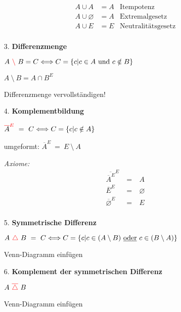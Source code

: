 \begin{itemize}[leftmargin=*]
\begin{align*}
                        A \cup A &= A & \text{Itempotenz} \\
                        A \cup \varnothing &= A & \text{Extremalgesetz} \\
                        A \cup E &= E & \text{Neutralitätsgesetz} \\
                        \end{align*}
                    \item[3.] \textbf{Differenzmenge}
                    \item[] $A \ \textcolor{red}{\setminus} \ B = C \Longleftrightarrow C = \{c|c \in A ~\text{und}~ c \notin B \}$
                    \item[] $A \ \setminus \ B = A \cap B^E$
                    \item[] Differenzmenge vervollständigen!   
                    \item[4.] \textbf{Komplementbildung}
                    \item[] $\textcolor{red}{\overline{\textcolor{black}{A}}^E} \ = \ C \Longleftrightarrow C = \{c|c \notin A \}$
                    \item[] umgeformt: $\overline{A}^E \ = \ E \ \setminus \ A$
                    \item[] \textit{Axiome:} \begin{eqnarray*}
                            \overline{\overline{A}^E}^E \ &=& \ A \\
                            \overline{E}^E \ &=& \ \varnothing \\
                            \overline{\varnothing}^E \ &=& \ E \\
                        \end{eqnarray*}
                    \item[5.] \textbf{Symmetrische Differenz}
                    \item[] $A \ \textcolor{red}{\triangle} \ B \ = \ C \Longleftrightarrow C = \{c|c \in (A \setminus B) ~\text{\underline{oder}}~ c \in (B     \setminus A)\}$
                    \item[] Venn-Diagramm einfügen
                    \item[6.]\textbf{Komplement der symmetrischen Differenz}
                    \item[] $A \ \rot{\overline{\triangle}} \ B$
                    \item[] Venn-Diagramm einfügen 
                \end{itemize}
